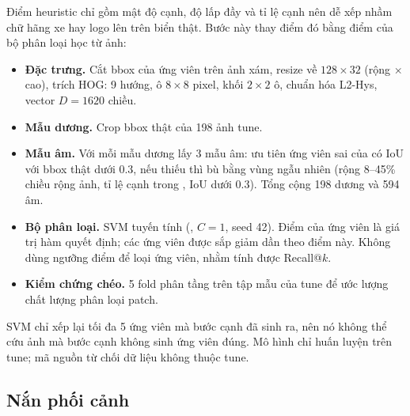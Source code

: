 Điểm heuristic chỉ gồm mật độ cạnh, độ lấp đầy và tỉ lệ cạnh nên dễ xếp nhầm chữ hãng xe hay logo lên trên biển thật. Bước này thay điểm đó bằng điểm của bộ phân loại học từ ảnh:
\begin{itemize}
  \item \textbf{Đặc trưng.} Cắt bbox của ứng viên trên ảnh xám, resize về $128\times 32$ (rộng $\times$ cao), trích HOG: 9 hướng, ô $8\times 8$ pixel, khối $2\times 2$ ô, chuẩn hóa L2-Hys, vector $D=1620$ chiều.
  \item \textbf{Mẫu dương.} Crop bbox thật của 198 ảnh tune.
  \item \textbf{Mẫu âm.} Với mỗi mẫu dương lấy 3 mẫu âm: ưu tiên ứng viên sai của  có IoU với bbox thật dưới 0.3, nếu thiếu thì bù bằng vùng ngẫu nhiên (rộng 8--45\% chiều rộng ảnh, tỉ lệ cạnh trong , IoU dưới 0.3). Tổng cộng 198 dương và 594 âm.
  \item \textbf{Bộ phân loại.} SVM tuyến tính (, $C=1$, seed 42). Điểm của ứng viên là giá trị hàm quyết định; các ứng viên được sắp giảm dần theo điểm này. Không dùng ngưỡng điểm để loại ứng viên, nhằm tính được Recall@$k$.
  \item \textbf{Kiểm chứng chéo.} 5 fold phân tầng trên tập mẫu của tune để ước lượng chất lượng phân loại patch.
\end{itemize}
SVM chỉ xếp lại tối đa 5 ứng viên mà bước cạnh đã sinh ra, nên nó không thể cứu ảnh mà bước cạnh không sinh ứng viên đúng. Mô hình chỉ huấn luyện trên tune; mã nguồn từ chối dữ liệu không thuộc tune.

\subsection{Nắn phối cảnh}
\label{sec:rectify}

